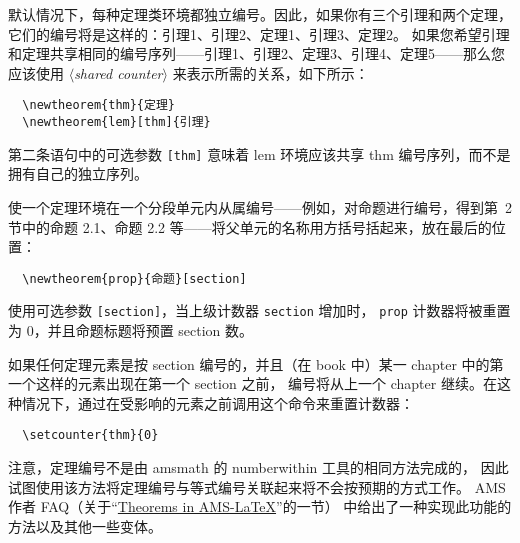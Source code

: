 \documentclass{article}
\providecommand{\qq}[1]{“#1”}
\newcommand{\ntt}{%
  \fontfamily\ttdefault \fontseries\mddefault \fontshape\updefault
  \selectfont
}
\DeclareRobustCommand{\cn}[1]{{\ntt\bslchar#1}}
\DeclareRobustCommand{\pkg}[1]{\textsf{#1}}
\DeclareRobustCommand{\env}[1]{{\ntt#1}}
\def\<#1>{{\normalfont$\langle$\textit{#1}$\rangle$}}
\begin{document}

默认情况下，每种定理类环境都独立编号。因此，如果你有三个引理和两个定理，
它们的编号将是这样的：引理1、引理2、定理1、引理3、定理2。
如果您希望引理和定理共享相同的编号序列——引理1、引理2、定理3、引理4、定理5——那么您应该使用 \<shared counter> 来表示所需的关系，如下所示：
\begin{verbatim}
  \newtheorem{thm}{定理}
  \newtheorem{lem}[thm]{引理}
\end{verbatim}
第二条语句中的可选参数 \verb+[thm]+ 意味着 \env{lem} 环境应该共享 \env{thm} 编号序列，而不是拥有自己的独立序列。

使一个定理环境在一个分段单元内从属编号——例如，对命题进行编号，得到第~2 节中的命题 2.1、命题 2.2 等——将父单元的名称用方括号括起来，放在最后的位置：
\begin{verbatim}
  \newtheorem{prop}{命题}[section]
\end{verbatim}
使用可选参数 \verb+[section]+，当上级计数器 \verb+section+ 增加时，
\verb+prop+ 计数器将被重置为 0，并且命题标题将预置 section 数。

如果任何定理元素是按 section 编号的，并且（在 book 中）某一 chapter 中的第一个这样的元素出现在第一个 section 之前，
编号将从上一个 chapter 继续。在这种情况下，通过在受影响的元素之前调用这个命令来重置计数器：
\begin{verbatim}
  \setcounter{thm}{0}
\end{verbatim}

注意，定理编号不是由 \pkg{amsmath} 的 \cn{numberwithin} 工具的相同方法完成的，
因此试图使用该方法将定理编号与等式编号关联起来将不会按预期的方式工作。
AMS 作者 FAQ（关于\qq{\href{http://www.ams.org//faq?class_id=561}{Theorems in AMS-\LaTeX}}的一节）
中给出了一种实现此功能的方法以及其他一些变体。

\end{document}
